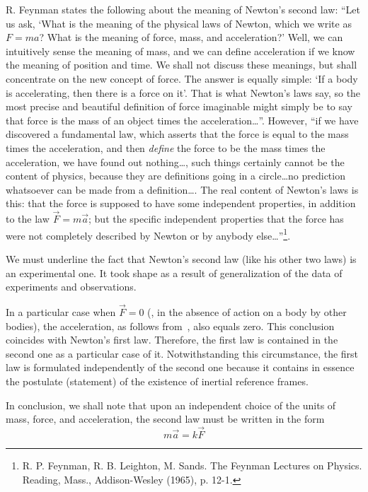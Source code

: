 R. Feynman states the following about the meaning of Newton's second law: ``Let us ask, `What is the meaning of the physical laws of Newton, which we write as $F=ma$? What is the meaning of force, mass, and acceleration?' Well, we can intuitively sense the meaning of mass, and we can define acceleration if we know the meaning of position and time. We shall not discuss these meanings, but shall concentrate on the new concept of force. The answer is equally simple: `If a body is accelerating, then there is a force on it'. That is what Newton's laws say, so the most precise and beautiful definition of force imaginable might simply be to say that force is the mass of an object times the acceleration\ldots''. However, ``if we have discovered a fundamental law, which asserts that the force is equal to the mass times the acceleration, and then \textit{define} the force to be the mass times the acceleration, we have found out nothing\ldots, such things certainly cannot be the content of physics, because they are definitions going in a circle\ldots no prediction whatsoever can be made from a definition\ldots. The real content of Newton's laws is this: that the force is supposed to have some independent properties, in addition to the law $\vec{F}=m\vec{a}$; but the specific independent properties that the force has were not completely described by Newton or by anybody else\ldots''\footnote{R. P. Feynman, R. B. Leighton, M. Sands. The Feynman Lectures on Physics. Reading, Mass., Addison-Wesley (1965), p. 12-1.}.

We must underline the fact that Newton's second law (like his other two laws) is an experimental one. It took shape as a result of generalization of the data of experiments and observations.

In a particular case when $\vec{F}=0$ (\ie, in the absence of action on a body by other bodies), the acceleration, as follows from~, also equals zero. This conclusion coincides with Newton's first law. Therefore, the first law is contained in the second one as a particular case of it. Notwithstanding this circumstance, the first law is formulated independently of the second one because it contains in essence the postulate (statement) of the existence of inertial reference frames.

In conclusion, we shall note that upon an independent choice of the units of mass, force, and acceleration, the second law must be written in the form
\begin{equation}\label{eq:2_12}
m\vec{a} = k\vec{F}
\end{equation}

